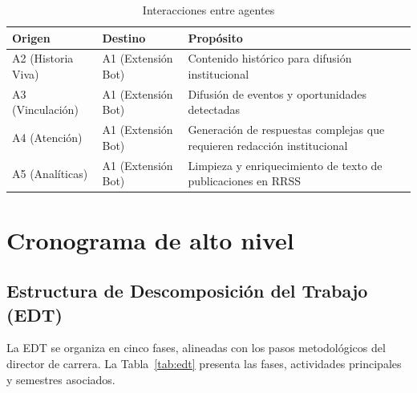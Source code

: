\documentclass[a4paper, 12pt]{article}
\begin{document}
\begin{table}[htbp]
  \centering
  \caption{Interacciones entre agentes}
  \label{tab:interacciones}
  \begin{tabularx}{\textwidth}{llX}
    \toprule
    \textbf{Origen} & \textbf{Destino} & \textbf{Prop\'osito} \\
    \midrule
    A2 (Historia Viva) & A1 (Extensi\'on Bot) & Contenido hist\'orico para difusi\'on institucional \\
    A3 (Vinculaci\'on) & A1 (Extensi\'on Bot) & Difusi\'on de eventos y oportunidades detectadas \\
    A4 (Atenci\'on)    & A1 (Extensi\'on Bot) & Generaci\'on de respuestas complejas que requieren redacci\'on institucional \\
    A5 (Anal\'iticas)  & A1 (Extensi\'on Bot) & Limpieza y enriquecimiento de texto de publicaciones en RRSS \\
    \bottomrule
  \end{tabularx}
\end{table}

\section{Cronograma de alto nivel}

\subsection{Estructura de Descomposici\'on del Trabajo (EDT)}

La EDT se organiza en cinco fases, alineadas con los pasos metodol\'ogicos del director de carrera. La Tabla~\ref{tab:edt} presenta las fases, actividades principales y semestres asociados.
\end{document}
